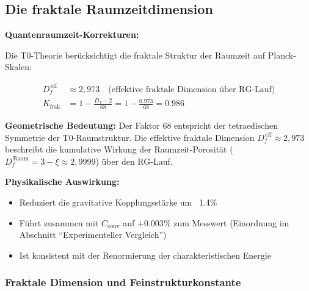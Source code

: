 	\subsection{Die fraktale Raumzeitdimension}
	
	\begin{derivation}
		\textbf{Quantenraumzeit-Korrekturen:}
		
		Die T0-Theorie berücksichtigt die fraktale Struktur der Raumzeit auf Planck-Skalen:
		
		\begin{align}
			D_f^{\,\text{eff}} &\approx 2{,}973 \quad \text{(effektive fraktale Dimension über RG-Lauf)} \\
			K_{\text{frak}} &= 1 - \frac{D_f - 2}{68} = 1 - \frac{0.973}{68} = 0.986
		\end{align}
		
		\textbf{Geometrische Bedeutung:} 
		Der Faktor 68 entspricht der tetraedischen Symmetrie der T0-Raumstruktur. Die effektive fraktale Dimension $D_f^{\,\text{eff}} \approx 2{,}973$ beschreibt die kumulative Wirkung der Raumzeit-Porosität ($D_f^{\,\text{Raum}} = 3 - \xi \approx 2{,}9999$) über den RG-Lauf.
		
		\textbf{Physikalische Auswirkung:}
		\begin{itemize}
			\item Reduziert die gravitative Kopplungsstärke um ~1.4\%
			\item Führt zusammen mit $C_{\text{conv}}$ auf $+0.003\%$ zum Messwert (Einordnung im Abschnitt \enquote{Experimenteller Vergleich})
			\item Ist konsistent mit der Renormierung der charakteristischen Energie
		\end{itemize}
	\end{derivation}
	
	\subsubsection{Fraktale Dimension und Feinstrukturkonstante}
	
